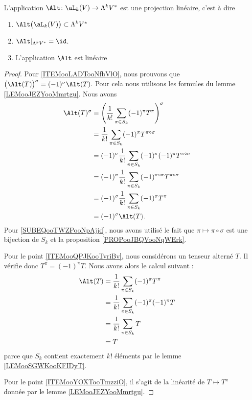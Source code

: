 \begin{lemma}		\label{LEMooWYCAooKoFpRu}
	L'application \(\Alt \colon \aL_k(V)\to \Lambda^kV^*  \) est une projection linéaire, c'est à dire
	\begin{enumerate}
		\item\label{ITEMooLADTooNfbVlO} \( \Alt\big( \aL_k(V) \big)\subset \Lambda^kV^*  \)
		\item\label{ITEMooQPJKooTvriBv} \( \Alt|_{\Lambda^kV^*}=\id\).
		\item		\label{ITEMooYOXTooTmzziO}
		      L'application \( \Alt\) est linéaire
	\end{enumerate}
\end{lemma}

\begin{proof}
	Pour \ref{ITEMooLADTooNfbVlO}, nous prouvons que \( \big( \Alt(T) \big)^{\sigma}=(-1)^{\sigma}\Alt(T)\). Pour cela nous utilisons les formules du lemme \ref{LEMooJEZYooMmrtgu}. Nous avons
	\begin{subequations}
		\begin{align}
			\Alt(T)^{\sigma} & = \left( \frac{1}{ k!}\sum_{\pi\in S_k}(-1)^{\pi}T^{\pi} \right)^{\sigma}                 \\
			                 & = \frac{1}{ k!}\sum_{\pi\in S_k}(-1)^{\pi}T^{\pi\circ\sigma}                              \\
			                 & = (-1)^{\sigma}\frac{1}{ k!}\sum_{\pi\in S_k}(-1)^{\sigma}(-1)^{\pi}T^{\pi\circ\sigma}    \\
			                 & = (-1)^{\sigma}\frac{1}{ k!}\sum_{\pi\in S_k}(-1)^{\pi\circ \sigma}T^{\pi\circ\sigma}     \\
			                 & = (-1)^{\sigma}\frac{1}{ k!}\sum_{\pi\in S_k}(-1)^{\pi}T^{\pi}		\label{SUBEQooTWZPooNpAjjd} \\
			                 & =(-1)^{\sigma}\Alt(T).
		\end{align}
	\end{subequations}
	Pour \eqref{SUBEQooTWZPooNpAjjd}, nous avons utilisé le fait que \( \pi\mapsto\pi\circ\sigma\) est une bijection de \( S_k\) et la proposition \ref{PROPooJBQVooNqWErk}.

	Pour le point \ref{ITEMooQPJKooTvriBv}, nous considérons un tenseur alterné \( T\). Il vérifie donc \( T^{\pi}=(-1)^{\pi}T\). Nous avons alors le calcul suivant :
	\begin{subequations}
		\begin{align}
			\Alt(T) & =\frac{1}{ k!}\sum_{\pi\in S_k}(-1)^{\pi}T^{\pi}     \\
			        & =\frac{1}{ k!}\sum_{\pi\in S_k}(-1)^{\pi}(-1)^{\pi}T \\
			        & =\frac{1}{ k!}\sum_{\pi\in S_k}T                     \\
			        & =T
		\end{align}
	\end{subequations}
	parce que \( S_k\) contient exactement \( k!\) éléments par le lemme \ref{LEMooSGWKooKFIDyT}.

	Pour le point \ref{ITEMooYOXTooTmzziO}, il s'agit de la linéarité de \( T\mapsto T^{\pi}\) donnée par le lemme \ref{LEMooJEZYooMmrtgu}.
\end{proof}

